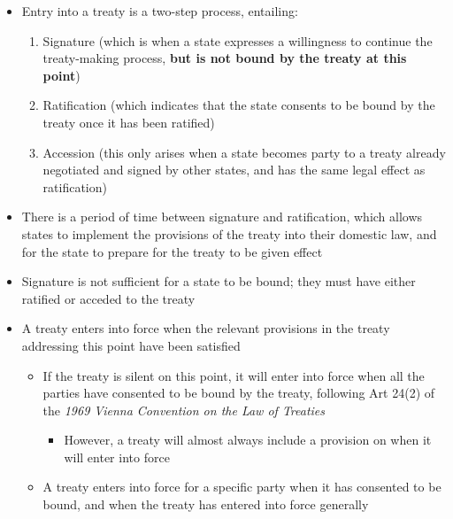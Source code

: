 \begin{itemize}
    \item Entry into a treaty is a two-step process, entailing:
    \begin{enumerate}
        \item Signature (which is when a state expresses a willingness to continue the treaty-making process, \textbf{but is not bound by the treaty at this point})
        \item Ratification (which indicates that the state consents to be bound by the treaty once it has been ratified)
        \item Accession (this only arises when a state becomes party to a treaty already negotiated and signed by other states, and has the same legal effect as ratification)
    \end{enumerate}
    \item There is a period of time between signature and ratification, which allows states to implement the provisions of the treaty into their domestic law, and for the state to prepare for the treaty to be given effect
    \item Signature is not sufficient for a state to be bound; they must have either ratified or acceded to the treaty
    \item A treaty enters into force when the relevant provisions in the treaty addressing this point have been satisfied
    \begin{itemize}
        \item If the treaty is silent on this point, it will enter into force when all the parties have consented to be bound by the treaty, following Art 24(2) of the \textit{1969 Vienna Convention on the Law of Treaties}
        \begin{itemize}
            \item However, a treaty will almost always include a provision on when it will enter into force
        \end{itemize}
        \item A treaty enters into force for a specific party when it has consented to be bound, and when the treaty has entered into force generally
    \end{itemize}
\end{itemize}

